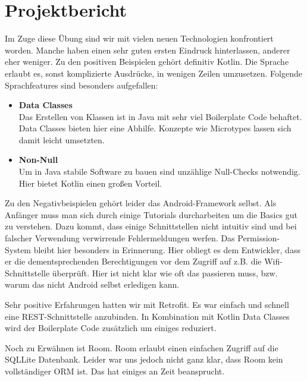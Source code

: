 \section{Projektbericht}

Im Zuge diese Übung sind wir mit vielen neuen Technologien konfrontiert worden. Manche haben einen sehr guten ersten Eindruck hinterlassen, anderer eher weniger. Zu den positiven Beispielen gehört definitiv Kotlin. Die Sprache erlaubt es, sonst komplizierte Ausdrücke, in wenigen Zeilen umzusetzen. Folgende Sprachfeatures sind besonders aufgefallen:
\begin{itemize}
	\item \textbf{Data Classes} \\
	Das Erstellen von Klassen ist in Java mit sehr viel Boilerplate Code behaftet. Data Classes bieten hier eine Abhilfe. Konzepte wie Microtypes lassen sich damit leicht umsetzten.

	\item \textbf{Non-Null} \\
	Um in Java stabile Software zu bauen sind unzählige Null-Checks notwendig. Hier bietet Kotlin einen großen Vorteil.
\end{itemize}

Zu den Negativbeispielen gehört leider das Android-Framework selbst. Als Anfänger muss man sich durch einige Tutorials durcharbeiten um die Basics gut zu verstehen. Dazu kommt, dass einige Schnittstellen nicht intuitiv sind und bei falscher Verwendung verwirrende Fehlermeldungen werfen. Das Permission-System bleibt hier besonders in Erinnerung. Hier obliegt es dem Entwickler, dass er die dementsprechenden Berechtigungen vor dem Zugriff auf z.B. die Wifi-Schnittstelle überprüft. Hier ist nicht klar wie oft das passieren muss, bzw. warum das nicht Android selbst erledigen kann.

Sehr positive Erfahrungen hatten wir mit Retrofit. Es war einfach und schnell eine REST-Schnittstelle anzubinden. In Kombination mit Kotlin Data Classes wird der Boilerplate Code zusätzlich um einiges reduziert.

Noch zu Erwähnen ist Room. Room erlaubt einen einfachen Zugriff auf die SQLLite Datenbank. Leider war uns jedoch nicht ganz klar, dass Room kein vollständiger ORM ist. Das hat einiges an Zeit beansprucht.

\begin{comment}
	Kotlin
	 - gute Erfahrung, interessante Sprache, vieles ist einfacher zu schreiben (data classes), Coroutines
	Android
	 - steile Lernkurve,  viele Sachen sind nicht intuitiv (Permissions), Exceptions vom Framework sind oft nichtsagend
	 Room
	 - Room ist kein ORM!!
	 Retrofit
	 - TOP, es ist sehr leicht, dass man eine WebAPI anbindet
\end{comment}